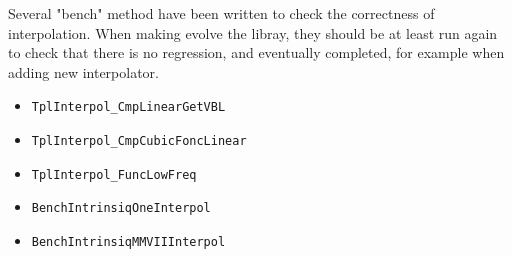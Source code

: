 Several "bench" method have been written to check the correctness of interpolation. When making evolve the
libray, they should be at least run again to check that there is no regression, and eventually completed,
for example when adding new interpolator.

\begin{itemize}
     \item {\tt TplInterpol\_CmpLinearGetVBL}
     \item {\tt TplInterpol\_CmpCubicFoncLinear}
     \item {\tt TplInterpol\_FuncLowFreq}
     \item {\tt BenchIntrinsiqOneInterpol}
     \item {\tt BenchIntrinsiqMMVIIInterpol}
\end{itemize}






